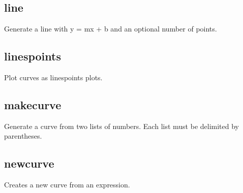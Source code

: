 \documentclass[letterpaper,10pt,english]{sphinxmanual}
\begin{document}
\subsection{line}
\label{\detokenize{curve_control_cmds:line}}
Generate a line with y = mx + b and an optional number of points.

\begin{sphinxVerbatim}[commandchars=\\\{\}]
\PYG{p}{[}\PYG{p}{]}      \PYG{p}{[}\PYG{c+c1}{\PYGZsh{} pts]}
\end{sphinxVerbatim}


\subsection{linespoints}
\label{\detokenize{curve_control_cmds:linespoints}}
Plot curves as linespoints plots.

\begin{sphinxVerbatim}[commandchars=\\\{\}]
\PYG{p}{[}\PYG{p}{]}     
\end{sphinxVerbatim}


\subsection{makecurve}
\label{\detokenize{curve_control_cmds:makecurve}}
Generate a curve from two lists of numbers. Each list must be delimited by parentheses. 

\begin{sphinxVerbatim}[commandchars=\\\{\}]
\PYG{p}{[}\PYG{p}{]}       
\end{sphinxVerbatim}


\subsection{newcurve}
\label{\detokenize{curve_control_cmds:newcurve}}
Creates a new curve from an expression.
\end{document}
